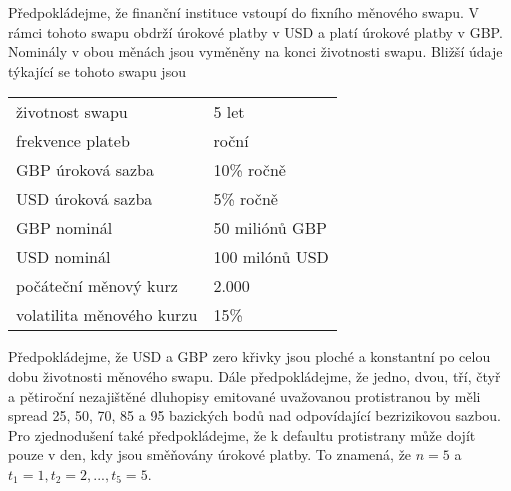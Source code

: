 \documentclass[a4paper]{book}
\begin{document}
Předpokládejme, že finanční instituce vstoupí do fixního měnového swapu. V rámci tohoto swapu obdrží úrokové platby v USD a platí úrokové platby v GBP. Nominály v obou měnách jsou vyměněny na konci životnosti swapu. Bližší údaje týkající se tohoto swapu jsou
\begin{center}
\begin{tabular}{l l}
životnost swapu			& 5 let \\
frekvence plateb		& roční \\
GBP úroková sazba		& 10\% ročně \\
USD úroková sazba		& 5\% ročně \\
GBP nominál			& 50 miliónů GBP \\
USD nominál			& 100 milónů USD \\
počáteční měnový kurz		& 2.000 \\
volatilita měnového kurzu	& 15\%
\end{tabular}
\end{center}
Předpokládejme, že USD a GBP zero křivky jsou ploché a konstantní po celou dobu životnosti měnového swapu. Dále předpokládejme, že jedno, dvou, tří, čtyř a pětiroční nezajištěné dluhopisy emitované uvažovanou protistranou by měli spread 25, 50, 70, 85 a 95 bazických bodů nad odpovídající bezrizikovou sazbou. Pro zjednodušení také předpokládejme, že k defaultu protistrany může dojít pouze v den, kdy jsou směňovány úrokové platby. To znamená, že $n=5$ a $t_1 = 1, t_2 = 2, ..., t_5 = 5$.
\end{document}

